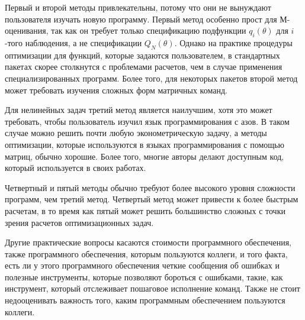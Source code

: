 Первый и второй методы привлекательны, потому что они не вынуждают пользователя изучать новую программу. Первый метод особенно прост для М-оценивания, так как он требует только спецификацию подфункции $q_i(\theta)$ для $i$-того наблюдения, а не спецификации $Q_N(\theta)$. Однако на практике процедуры оптимизации для функций, которые задаются пользователем, в стандартных пакетах скорее столкнутся с проблемами расчетов, чем в случае применения специализированных программ. Более того, для некоторых пакетов второй метод может требовать изучения сложных форм матричных команд.

Для нелинейных задач третий метод является наилучшим, хотя это может требовать, чтобы пользователь изучил язык программирования с азов. В таком случае можно решить почти любую эконометрическую задачу, а методы оптимизации, которые используются в языках программирования с помощью матриц, обычно хорошие. Более того, многие авторы делают доступным код, который используется в своих работах.

Четвертный и пятый методы обычно требуют более высокого уровня сложности программ, чем третий метод. Четвертый метод может привести к более быстрым расчетам, в то время как пятый может решить большинство сложных с точки зрения расчетов оптимизационных задач.

Другие практические вопросы касаются стоимости программного обеспечения, также программного обеспечения, которым пользуются коллеги, и того факта, есть ли у этого программного обеспечения четкие сообщения об ошибках и полезные инструменты, которые позволяют бороться с ошибками, такие, как инструмент, который отслеживает пошаговое исполнение команд. Также не стоит недооценивать важность того, каким программным обеспечением пользуются коллеги.

